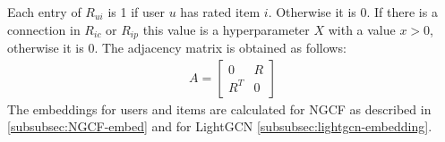Each entry of $R_{ui}$ is 1 if user $u$ has rated item $i$. Otherwise it is 0.
If there is a connection in $R_{ic}$ or $R_{ip}$ this value is a hyperparameter $X$ with a value $x>0$, otherwise it is 0.
The adjacency matrix is obtained as follows:
\begin{gather}
    A =
    \begin{bmatrix}
        0   & R \\
        R^T & 0
    \end{bmatrix}
\end{gather}
The embeddings for users and items are calculated for NGCF as described in \autoref{subsubsec:NGCF-embed} and for LightGCN \autoref{subsubsec:lightgcn-embedding}.
